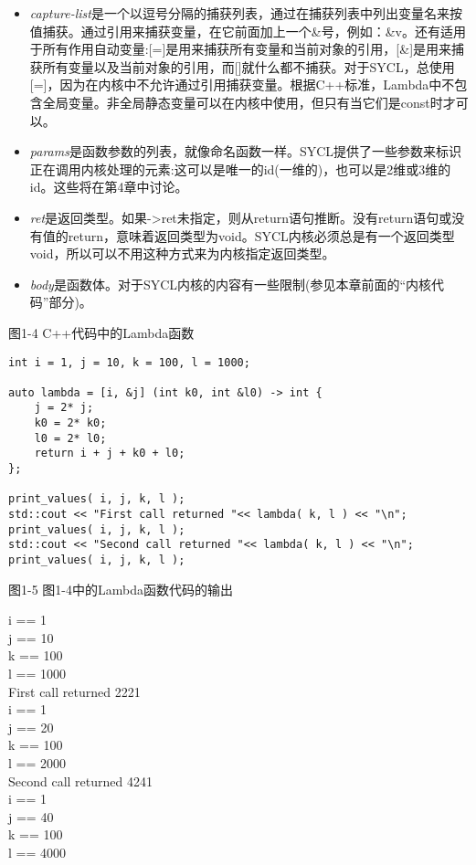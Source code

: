 \begin{itemize}
	\item \textit{capture-list}是一个以逗号分隔的捕获列表，通过在捕获列表中列出变量名来按值捕获。通过引用来捕获变量，在它前面加上一个\&号，例如：\&v。还有适用于所有作用自动变量:[=]是用来捕获所有变量和当前对象的引用，[\&]是用来捕获所有变量以及当前对象的引用，而[]就什么都不捕获。对于SYCL，总使用[=]，因为在内核中不允许通过引用捕获变量。根据C++标准，Lambda中不包含全局变量。非全局静态变量可以在内核中使用，但只有当它们是const时才可以。
	\item \textit{params}是函数参数的列表，就像命名函数一样。SYCL提供了一些参数来标识正在调用内核处理的元素:这可以是唯一的id(一维的)，也可以是2维或3维的id。这些将在第4章中讨论。
	\item \textit{ret}是返回类型。如果->ret未指定，则从return语句推断。没有return语句或没有值的return，意味着返回类型为void。SYCL内核必须总是有一个返回类型void，所以可以不用这种方式来为内核指定返回类型。
	\item \textit{body}是函数体。对于SYCL内核的内容有一些限制(参见本章前面的“内核代码”部分)。
\end{itemize}

图1-4 C++代码中的Lambda函数
\begin{lstlisting}[caption={}]
int i = 1, j = 10, k = 100, l = 1000;

auto lambda = [i, &j] (int k0, int &l0) -> int {
	j = 2* j;
	k0 = 2* k0;
	l0 = 2* l0;
	return i + j + k0 + l0;
};

print_values( i, j, k, l );
std::cout << "First call returned "<< lambda( k, l ) << "\n";
print_values( i, j, k, l );
std::cout << "Second call returned "<< lambda( k, l ) << "\n";
print_values( i, j, k, l );
\end{lstlisting}

图1-5 图1-4中的Lambda函数代码的输出
\begin{tcolorbox}[colback=white,colframe=black]
i == 1 \\
j == 10 \\
k == 100 \\
l == 1000 \\
First call returned 2221 \\
i == 1 \\
j == 20 \\
k == 100 \\
l == 2000 \\
Second call returned 4241 \\
i == 1 \\
j == 40 \\
k == 100 \\
l == 4000 
\end{tcolorbox}

